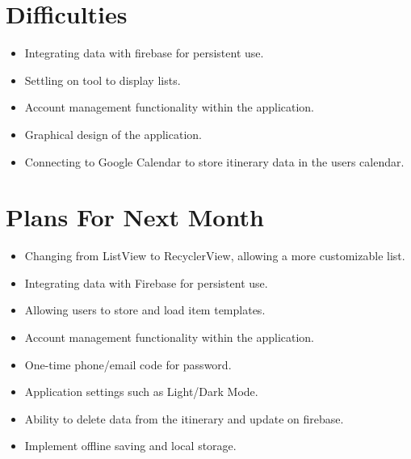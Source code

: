 \documentclass[12pt]{article}
\begin{document}
{\begin{itemize}
	\end{itemize}

	\section*{Difficulties}
	\begin{itemize}
		\item Integrating data with firebase for persistent use.
		\item Settling on tool to display lists.
		\item Account management functionality within the application.
		\item Graphical design of the application.
		\item Connecting to Google Calendar to store itinerary data in the users calendar.
	\end{itemize}

	\section*{Plans For Next Month}
	\begin{itemize}
		\item Changing from ListView to RecyclerView, allowing a more customizable list.
		\item Integrating data with Firebase for persistent use.
		\item Allowing users to store and load item templates.
		\item Account management functionality within the application.
		\item One-time phone/email code for password.
		\item Application settings such as Light/Dark Mode.

		\item Ability to delete data from the itinerary and update on firebase.
		\item Implement offline saving and local storage.
	\end{itemize}
}
\end{document}
